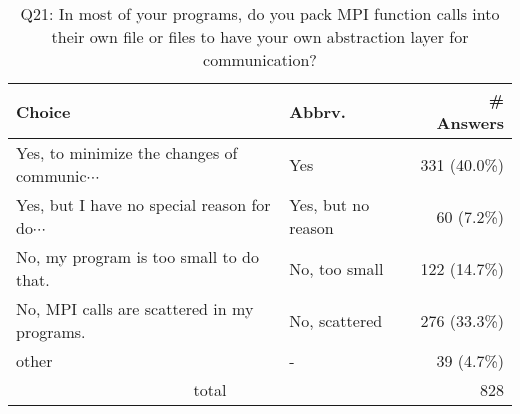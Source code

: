 \begin{table}[htb]%
\begin{center}%
\caption{Q21: In most of your programs, do you pack MPI function calls into their own file or files to have your own abstraction layer for communication?}%
\label{tab:Q21-ans}%
\begin{tabular}{l|l|r}%
\hline%
Choice & Abbrv. & \# Answers \\%
\hline%
{\small Yes, to minimize the changes of communic$\cdots$} & Yes & 331 (40.0\%) \\%
{\small Yes, but I have no special reason for do$\cdots$} & Yes, but no reason & 60 (7.2\%) \\%
No, my program is too small to do that. & No, too small & 122 (14.7\%) \\%
{\small No, MPI calls are scattered in my programs.} & No, scattered & 276 (33.3\%) \\%
other & - & 39 (4.7\%) \\%
\hline%
\multicolumn{2}{c}{total} & 828 \\%
\hline%
\end{tabular}%
\end{center}%
\end{table}%
